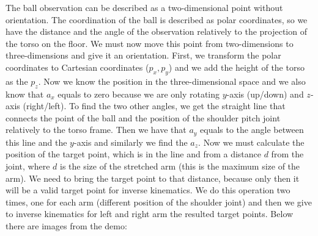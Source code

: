 The ball observation can be described as a two-dimensional point without orientation. The coordination of the ball is described as polar coordinates, so we have the distance and the angle of the observation relatively to the projection of the torso on the floor. We must now move this point from two-dimensions to three-dimensions and give it an orientation. First, we transform the polar coordinates to Cartesian coordinates ($ p_x,p_y $) and we add the height of the torso as the $p_z$. Now we know the position in the three-dimensional space and we also know that $a_x$ equals to zero because we are only rotating $y$-axis (up/down) and $z$-axis (right/left). To find the two other angles, we get the straight line that connects the point of the ball and the position of the shoulder pitch joint relatively to the torso frame. Then we have that $a_y$ equals to the angle between this line and the $y$-axis and similarly we find the $a_z$. Now we must calculate the position of the target point, which is in the line and from a distance $d$ from the joint, where $d$ is the size of the stretched arm (this is the maximum size of the arm). We need to bring the target point to that distance, because only then it will be a valid target point for inverse kinematics. We do this operation two times, one for each arm (different position of the shoulder joint) and then we give to inverse kinematics for left and right arm the resulted target points. Below there are images from the demo:

